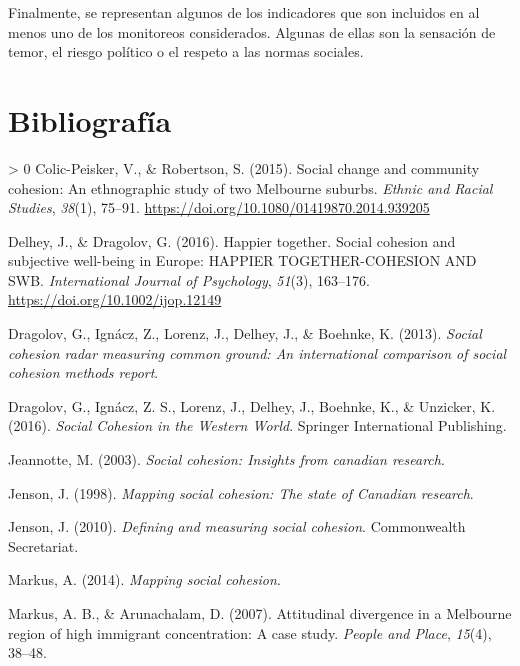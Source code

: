 \documentclass[
  12pt,
]{book}
\newlength{\cslhangindent}
\newenvironment{CSLReferences}[3] %
 {%
  \setlength{\parindent}{0pt}
  \ifodd #1 \everypar{\setlength{\hangindent}{\cslhangindent}}\ignorespaces\fi
  \ifnum #2 > 0
  \setlength{\parskip}{#2\baselineskip}
  \fi
 }%
 {}
\begin{document}
Finalmente, se representan algunos de los indicadores que son incluidos en al menos uno de los monitoreos considerados. Algunas de ellas son la sensación de temor, el riesgo político o el respeto a las normas sociales.

\hypertarget{bibliografuxeda}{%
\chapter*{Bibliografía}\label{bibliografuxeda}}

\hypertarget{refs}{}
\begin{CSLReferences}{1}{0}
\leavevmode\hypertarget{ref-colic-peisker_Social_2015}{}%
Colic-Peisker, V., \& Robertson, S. (2015). Social change and community cohesion: An ethnographic study of two {Melbourne} suburbs. \emph{Ethnic and Racial Studies}, \emph{38}(1), 75--91. \url{https://doi.org/10.1080/01419870.2014.939205}

\leavevmode\hypertarget{ref-delhey_Happier_2016}{}%
Delhey, J., \& Dragolov, G. (2016). Happier together. {Social} cohesion and subjective well-being in {Europe}: {HAPPIER TOGETHER}-{COHESION AND SWB}. \emph{International Journal of Psychology}, \emph{51}(3), 163--176. \url{https://doi.org/10.1002/ijop.12149}

\leavevmode\hypertarget{ref-dragolov2013social}{}%
Dragolov, G., Ignácz, Z., Lorenz, J., Delhey, J., \& Boehnke, K. (2013). \emph{Social cohesion radar measuring common ground: {An} international comparison of social cohesion methods report}.

\leavevmode\hypertarget{ref-dragolov_Social_2016}{}%
Dragolov, G., Ignácz, Z. S., Lorenz, J., Delhey, J., Boehnke, K., \& Unzicker, K. (2016). \emph{Social {Cohesion} in the {Western World}}. {Springer International Publishing}.

\leavevmode\hypertarget{ref-Jeannote2003}{}%
Jeannotte, M. (2003). \emph{Social cohesion: {Insights} from canadian research}.

\leavevmode\hypertarget{ref-jenson1998mapping}{}%
Jenson, J. (1998). \emph{Mapping social cohesion: {The} state of {Canadian} research}.

\leavevmode\hypertarget{ref-jenson2010defining}{}%
Jenson, J. (2010). \emph{Defining and measuring social cohesion}. {Commonwealth Secretariat}.

\leavevmode\hypertarget{ref-markus2013mapping}{}%
Markus, A. (2014). \emph{Mapping social cohesion}.

\leavevmode\hypertarget{ref-markus_Attitudinal_2007}{}%
Markus, A. B., \& Arunachalam, D. (2007). Attitudinal divergence in a {Melbourne} region of high immigrant concentration: {A} case study. \emph{People and Place}, \emph{15}(4), 38--48.


\end{CSLReferences}
\end{document}
